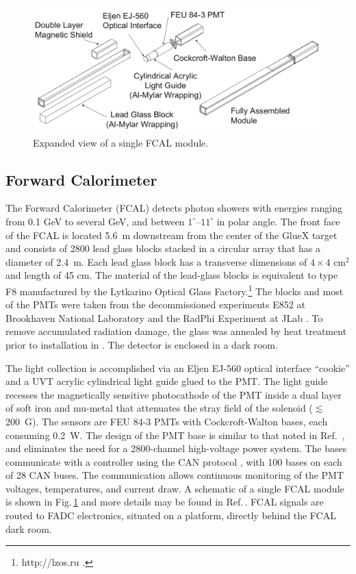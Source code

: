 \begin{figure}[tbp]\centering
\includegraphics[height=5cm]{figures/FCAL_single_module}
\caption{\label{fig:fcal:FCAL_single_module}
    Expanded view of a single FCAL module.
  }
\end{figure} 
\subsection{Forward Calorimeter \label{sec:fcal}}
The Forward Calorimeter (FCAL) detects photon showers with energies ranging from 0.1 GeV to several GeV, and  between $1^{\circ}$--$11^{\circ}$ in polar angle. 
The front face of the FCAL is located 5.6~m downstream from the center of the GlueX target and consists of 2800 lead glass blocks stacked in a circular array that has a diameter of 2.4~m. Each lead glass block has a transverse dimensions of $4\times4$ cm$^2$ and length of 45 cm.
The material of the lead-glass blocks is equivalent to type F8 manufactured by the Lytkarino Optical Glass Factory.\footnote{http://lzos.ru .} The blocks and most of the PMTs were taken from the decommissioned experiments E852 at Brookhaven National Laboratory \cite{CRITTENDEN1997377} and the RadPhi Experiment at JLab \cite{JONES2007384}. To remove accumulated radiation damage, the glass was annealed by heat treatment prior to installation in \gx{}. The detector is enclosed in a dark room.

The light collection is accomplished via an Eljen EJ-560 optical interface ``cookie'' and a UVT acrylic cylindrical light guide glued to the PMT. The light guide recesses the magnetically sensitive photocathode of the PMT inside a dual layer of soft iron and mu-metal that attenuates the stray field  of the \gx{} solenoid ($\lesssim$200~G). The sensors are FEU 84-3 PMTs with Cockcroft-Walton bases, each consuming 0.2~W.  The design of the PMT base is similar to that noted in Ref.~\cite{Brunner:1998fh}, and eliminates the need for a 2800-channel high-voltage power system. The bases communicate with a controller using the CAN protocol \cite{wiki:CANBus}, with 100 bases on each of 28 CAN buses.  The communication allows continuous monitoring of the PMT voltages, temperatures, and current draw.
A schematic of a single FCAL module is shown in 
Fig.\,\ref{fig:fcal:FCAL_single_module} and more details may be found in Ref.\,\cite{MORIYA201360}. FCAL signals are routed to FADC electronics, situated on a platform, directly behind the FCAL dark room.

